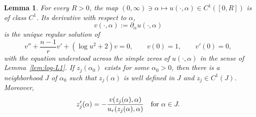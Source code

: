 \documentclass[11pt]{article}
\newtheorem{lemma}[theorem]{Lemma}
\begin{document}
\begin{lemma}\label{lem:log-C1}
For every $R>0$, the map $(0,\infty)\ni\alpha\mapsto u(\cdot,\alpha)\in C^1([0,R])$
is of class $C^1$. Its derivative with respect to $\alpha$,
\[
 v(\cdot,\alpha):=\partial_\alpha u(\cdot,\alpha)
\]
is the unique regular solution of
\begin{equation}\label{eq:var}
 v''+\frac{n-1}{r}v'+(\log u^2+2)v=0,
 \qquad
 v(0)=1,
 \qquad
 v'(0)=0,
\end{equation}
with the equation understood across the simple zeros of $u(\cdot,\alpha)$ in the sense of Lemma~\ref{lem:log-L1}.
If $z_j(\alpha_0)$ exists for some $\alpha_0>0$, then there is a neighborhood $J$ of
$\alpha_0$ such that $z_j(\alpha)$ is well defined in $J$ and
$z_j\in C^1(J)$. Moreover,
\begin{equation}\label{eq:zderivative}
 z_j'(\alpha)=-\frac{v(z_j(\alpha),\alpha)}{u_r(z_j(\alpha),\alpha)}\quad \hbox{for }\alpha\in J.
\end{equation}
\end{lemma}
\end{document}
